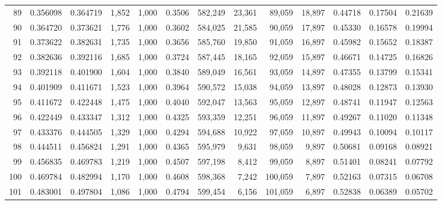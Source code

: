 \begin{tabular}{rrrrrrrrrrrrr}
89  &  0.356098 &  0.364719 &   1,852 &  1,000 &                                     0.3506 &  582,249 &   23,361 &   89,059 &   18,897 &  0.44718 &  0.17504 &  0.21639 \\
90  &  0.364720 &  0.373621 &   1,776 &  1,000 &                                     0.3602 &  584,025 &   21,585 &   90,059 &   17,897 &  0.45330 &  0.16578 &  0.19994 \\
91  &  0.373622 &  0.382631 &   1,735 &  1,000 &                                     0.3656 &  585,760 &   19,850 &   91,059 &   16,897 &  0.45982 &  0.15652 &  0.18387 \\
92  &  0.382636 &  0.392116 &   1,685 &  1,000 &                                     0.3724 &  587,445 &   18,165 &   92,059 &   15,897 &  0.46671 &  0.14725 &  0.16826 \\
93  &  0.392118 &  0.401900 &   1,604 &  1,000 &                                     0.3840 &  589,049 &   16,561 &   93,059 &   14,897 &  0.47355 &  0.13799 &  0.15341 \\
94  &  0.401909 &  0.411671 &   1,523 &  1,000 &                                     0.3964 &  590,572 &   15,038 &   94,059 &   13,897 &  0.48028 &  0.12873 &  0.13930 \\
95  &  0.411672 &  0.422448 &   1,475 &  1,000 &                                     0.4040 &  592,047 &   13,563 &   95,059 &   12,897 &  0.48741 &  0.11947 &  0.12563 \\
96  &  0.422449 &  0.433347 &   1,312 &  1,000 &                                     0.4325 &  593,359 &   12,251 &   96,059 &   11,897 &  0.49267 &  0.11020 &  0.11348 \\
97  &  0.433376 &  0.444505 &   1,329 &  1,000 &                                     0.4294 &  594,688 &   10,922 &   97,059 &   10,897 &  0.49943 &  0.10094 &  0.10117 \\
98  &  0.444511 &  0.456824 &   1,291 &  1,000 &                                     0.4365 &  595,979 &    9,631 &   98,059 &    9,897 &  0.50681 &  0.09168 &  0.08921 \\
99  &  0.456835 &  0.469783 &   1,219 &  1,000 &                                     0.4507 &  597,198 &    8,412 &   99,059 &    8,897 &  0.51401 &  0.08241 &  0.07792 \\
100 &  0.469784 &  0.482994 &   1,170 &  1,000 &                                     0.4608 &  598,368 &    7,242 &  100,059 &    7,897 &  0.52163 &  0.07315 &  0.06708 \\
101 &  0.483001 &  0.497804 &   1,086 &  1,000 &                                     0.4794 &  599,454 &    6,156 &  101,059 &    6,897 &  0.52838 &  0.06389 &  0.05702 \\

\end{tabular}
